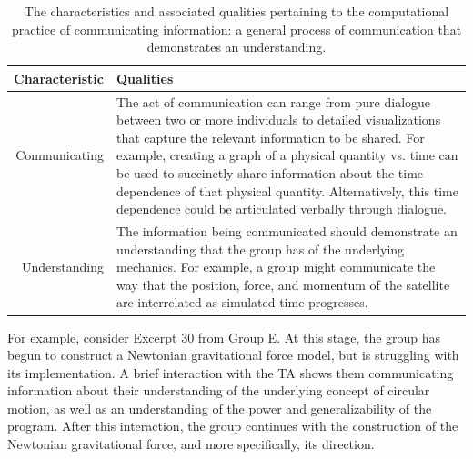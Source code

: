 \documentclass{msuphddissertation}
\begin{document}
\begin{doublespace}
\begin{table}
\begin{tabular}{r|p{}}
Characteristic & Qualities \\\hline\hline
Communicating & The act of communication can range from pure dialogue between two or more individuals to detailed visualizations that capture the relevant information to be shared.  For example, creating a graph of a physical quantity vs. time can be used to succinctly share information about the time dependence of that physical quantity.  Alternatively, this time dependence could be articulated verbally through dialogue.\\
Understanding & The information being communicated should demonstrate an understanding that the group has of the underlying mechanics.  For example, a group might communicate the way that the position, force, and momentum of the satellite are interrelated as simulated time progresses.\\
\end{tabular}\caption{The characteristics and associated qualities pertaining to the computational practice of communicating information: a general process of communication that demonstrates an understanding.}\label{CH5:CommunicatingInformation}
\end{table}

For example, consider Excerpt 30 from Group E.  At this stage, the group has begun to construct a Newtonian gravitational force model, but is struggling with its implementation.  A brief interaction with the TA shows them communicating information about their understanding of the underlying concept of circular motion, as well as an understanding of the power and generalizability of the program.  After this interaction, the group continues with the construction of the Newtonian gravitational force, and more specifically, its direction.


\end{doublespace}
\end{document}

